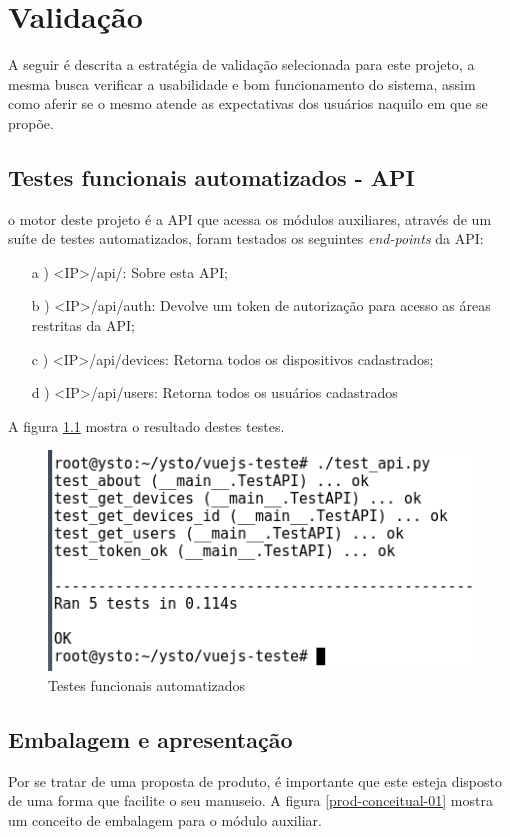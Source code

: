 \chapter{Validação}

A seguir é descrita a estratégia de validação selecionada para este projeto, a mesma busca verificar a usabilidade e bom funcionamento do sistema, assim como aferir se o mesmo atende as expectativas dos usuários naquilo em que se propõe.

\section{Testes funcionais automatizados - API}
o motor deste projeto é a API que acessa os módulos auxiliares, através de um suíte de testes automatizados, foram testados os seguintes \textit{end-points} da API:

\begin{itemize}
    \item[a]) <IP>/api/: Sobre esta API;
    \item[b]) <IP>/api/auth: Devolve um token de autorização para acesso as áreas restritas da API;
    \item[c]) <IP>/api/devices: Retorna todos os dispositivos cadastrados;
    \item[d]) <IP>/api/users: Retorna todos os usuários cadastrados
\end{itemize}

A figura \ref{teste-api} mostra o resultado destes testes.

\begin{figure}[H]
\caption{\label{teste-api} Testes funcionais automatizados}
\includegraphics[scale=0.5]{img/test_api.png}
\end{figure}

\section{Embalagem e apresentação}
Por se tratar de uma proposta de produto, é importante que este esteja disposto de uma forma que facilite o seu manuseio. A figura \ref{prod-conceitual-01} mostra um conceito de embalagem para o módulo auxiliar.

